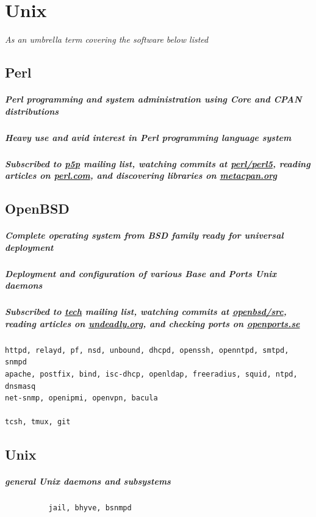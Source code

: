 \documentclass {article}
\begin{document}
  \section{Unix} %
    \textit{As an umbrella term covering the software below listed}

    \subsection{Perl}
      \subparagraph{Perl programming and system administration using Core and CPAN distributions}
      \subparagraph{Heavy use and avid interest in Perl programming language system}
      \subparagraph{Subscribed to \href{https://lists.perl.org/list/perl5-porters.html}{p5p} mailing list, watching commits at \href{https://github.com/Perl/perl5}{perl/perl5}, reading articles on \href{https://perl.com/}{perl.com}, and discovering libraries on \href{https://metacpan.org/}{metacpan.org}}

    \subsection{OpenBSD}
      \subparagraph{Complete operating system from BSD family ready for universal deployment}
      \subparagraph{Deployment and configuration of various Base and Ports Unix daemons}
      \subparagraph{Subscribed to \href{https://www.openbsd.org/mail.html}{tech} mailing list, watching commits at \href{https://github.com/openbsd/src}{openbsd/src}, reading articles on \href{https://undeadly.org//}{undeadly.org}, and checking ports on \href{https://openports.se/}{openports.se}}
      \begin{verbatim}
httpd, relayd, pf, nsd, unbound, dhcpd, openssh, openntpd, smtpd, snmpd
apache, postfix, bind, isc-dhcp, openldap, freeradius, squid, ntpd, dnsmasq
net-snmp, openipmi, openvpn, bacula

tcsh, tmux, git
      \end{verbatim}

      \subsection{Unix}
        \subparagraph{general Unix daemons and subsystems}
        \begin{verbatim}
          jail, bhyve, bsnmpd
        \end{verbatim}
\end{document}
